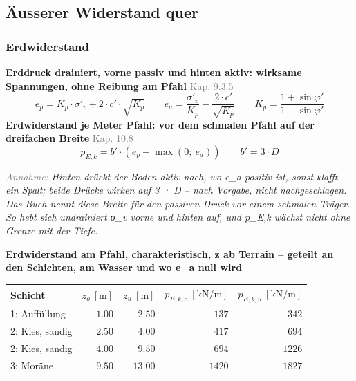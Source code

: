 \documentclass[11pt,a4paper]{article}
\newcommand{\normref}[1]{{\small\textcolor{gray}{#1}}}
\newcommand{\hinweis}[2]{\par\noindent\textcolor{gray}{\textit{#1:}} \textit{#2}\par}
\begin{document}
\subsection{Äusserer Widerstand quer}
\subsubsection{Erdwiderstand}
\noindent\textbf{Erddruck drainiert, vorne passiv und hinten aktiv: wirksame Spannungen, ohne Reibung am Pfahl} \hfill \normref{Kap. 9.3.5}
\begin{equation*}
e_p = K_p \cdot \sigma'_v + 2 \cdot c' \cdot \sqrt{K_p} \qquad e_a = \frac{\sigma'_v}{K_p} - \frac{2 \cdot c'}{\sqrt{K_p}} \qquad K_p = \frac{1 + \sin\varphi'}{1 - \sin\varphi'}
\end{equation*}
\noindent\textbf{Erdwiderstand je Meter Pfahl: vor dem schmalen Pfahl auf der dreifachen Breite} \hfill \normref{Kap. 10.8}
\begin{equation*}
p_{E,k} = b' \cdot \left(e_p - \max\left(0;\ e_a\right)\right) \qquad b' = 3 \cdot D
\end{equation*}
\hinweis{Annahme}{Hinten drückt der Boden aktiv nach, wo e\_a positiv ist, sonst klafft ein Spalt; beide Drücke wirken auf 3 · D -- nach Vorgabe, nicht nachgeschlagen. Das Buch nennt diese Breite für den passiven Druck vor einem schmalen Träger. So hebt sich undrainiert σ\_v vorne und hinten auf, und p\_E,k wächst nicht ohne Grenze mit der Tiefe.}
\noindent\textbf{Erdwiderstand am Pfahl, charakteristisch, z ab Terrain -- geteilt an den Schichten, am Wasser und wo e\_a null wird}
\begin{longtable}{lrrrr}
\hline
Schicht & $z_o\ [\mathrm{m}]$ & $z_u\ [\mathrm{m}]$ & $p_{E,k,o}\ [\mathrm{kN/m}]$ & $p_{E,k,u}\ [\mathrm{kN/m}]$ \\
\hline
\endhead
1: Auffüllung & $1.00$ & $2.50$ & $137$ & $342$ \\
2: Kies, sandig & $2.50$ & $4.00$ & $417$ & $694$ \\
2: Kies, sandig & $4.00$ & $9.50$ & $694$ & $1226$ \\
3: Moräne & $9.50$ & $13.00$ & $1420$ & $1827$ \\
\hline
\end{longtable}
\end{document}

